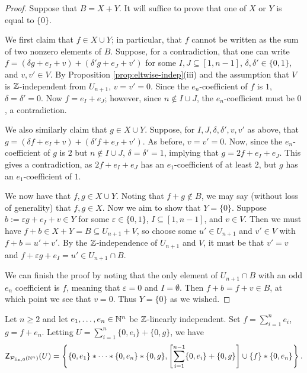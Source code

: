 \begin{proof}
	Suppose that $B = X + Y$.
	It will suffice to prove that one of $X$ or $Y$ is equal to $\{0\}$.

	We first claim that $f\in X\cup Y$; in particular, that $f$ cannot be written as the sum of two nonzero elements of $B$.
	Suppose, for a contradiction, that one can write $f = (\delta g + e_I + v) + (\delta' g + e_J + v')$ for some $I,J\subseteq [1,n-1]$, $\delta,\delta'\in\{0,1\}$, and $v,v'\in V$.
	By Proposition \ref{prop:eltwise-indep}(iii) and the assumption that $V$ is $\mathbb{Z}$-independent from $U_{n+1}$, $v=v' = 0$.
	Since the $e_n$-coefficient of $f$ is $1$, $\delta = \delta' = 0$.
	Now $f = e_I + e_J$; however, since $n\notin I\cup J$, the $e_n$-coefficient must be $0$, a contradiction.
	
	We also similarly claim that $g \in X\cup Y$.  
	Suppose, for $I,J,\delta,\delta',v,v'$ as above, that $g = (\delta f + e_I + v) + (\delta' f + e_J + v')$.
	As before, $v=v'=0$.
	Now, since the $e_n$-coefficient of $g$ is $2$ but $n\notin I\cup J$, $\delta = \delta' = 1$, implying that $g = 2f + e_I + e_J$.
	This gives a contradiction, as $2f + e_I + e_J$ has an $e_1$-coefficient of at least $2$, but $g$ has an $e_1$-coefficient of $1$.
	
	We now have that $f,g\in X \cup Y$.
	Noting that $f+g \notin B$, we may say (without loss of generality) that $f,g\in X$.
	Now we aim to show that $Y = \{0\}$.
	Suppose $b := \varepsilon g + e_I +v \in Y$ for some $\varepsilon \in \{0,1\}$, $I\subseteq [ 1,n-1]$, and $v\in V$.
	Then we must have $f + b \in X+Y = B \subseteq U_{n+1} + V$, so choose some $u'\in U_{n+1}$ and $v'\in V$ with $f + b = u' + v'$.
	By the $\mathbb{Z}$-independence of $U_{n+1}$ and $V$, it must be that $v' = v$ and $f + \varepsilon g + e_I = u' \in U_{n+1} \cap B$.
	
	We can finish the proof by noting that the only element of $U_{n+1}\cap B$ with an odd $e_n$ coefficient is $f$, meaning that $\varepsilon=0$ and $I = \emptyset$.
	Then $f+b = f+v \in B$, at which point we see that $v = 0$.
	Thus $Y = \{0\}$ as we wished.
\end{proof}

\begin{thm} \label{thm:2n-length-set}
	Let $n\ge 2$ and let $e_1,\dots, e_n\in \mathbb{N}^n$ be $\mathbb{Z}$-linearly independent.
	Set $f = \sum_{i=1}^n e_i$, $g=f+e_n$.
	Letting $U = \sum_{i=1}^n \{0,e_i\} + \{0,g\}$, we have 
	\[\mathsf{Z}_{\mathcal{P}_{\textrm{fin}, 0}(\mathbb{N}^n)}(U) = \left\{ \{0,e_1\}*\cdots*\{0,e_n\}*\{0,g\}, \left[\sum_{i=1}^{n-1}\{0,e_i\}+\{0,g\}\right]\cup\{f\} * \{0,e_n\} \right\}. \]
\end{thm}

